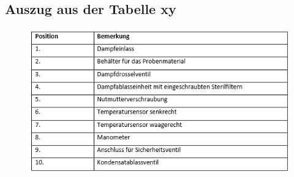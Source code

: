 \newpage
\begin{appendix}





%




\chapter{Auszug aus der Tabelle xy}
\begin{figure}[ht]
	\centering
  \includegraphics[width=\textwidth]{Anhang/tabelle1.png}
\end{figure}





\end{appendix}
